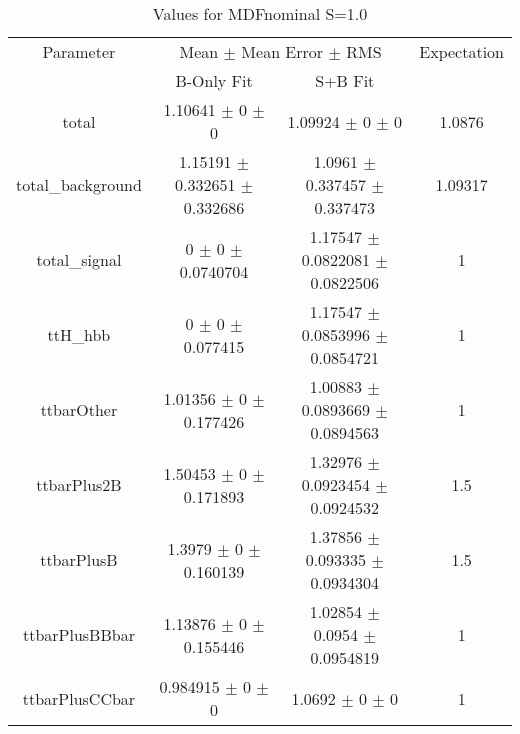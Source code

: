 \begin{table}
\centering
\caption{Values for MDFnominal S=1.0}
\begin{tabular}{cccc}
\toprule
Parameter & \multicolumn{2}{c}{Mean $\pm$ Mean Error $\pm$ RMS} & Expectation\\
 & B-Only Fit & S+B Fit & \\
\midrule
total & \num{1.10641} $\pm$ \num{0} $\pm$ \num{0} & \num{1.09924} $\pm$ \num{0} $\pm$ \num{0} & \num{1.0876}\\
total\_background & \num{1.15191} $\pm$ \num{0.332651} $\pm$ \num{0.332686} & \num{1.0961} $\pm$ \num{0.337457} $\pm$ \num{0.337473} & \num{1.09317}\\
total\_signal & \num{0} $\pm$ \num{0} $\pm$ \num{0.0740704} & \num{1.17547} $\pm$ \num{0.0822081} $\pm$ \num{0.0822506} & \num{1}\\
ttH\_hbb & \num{0} $\pm$ \num{0} $\pm$ \num{0.077415} & \num{1.17547} $\pm$ \num{0.0853996} $\pm$ \num{0.0854721} & \num{1}\\
ttbarOther & \num{1.01356} $\pm$ \num{0} $\pm$ \num{0.177426} & \num{1.00883} $\pm$ \num{0.0893669} $\pm$ \num{0.0894563} & \num{1}\\
ttbarPlus2B & \num{1.50453} $\pm$ \num{0} $\pm$ \num{0.171893} & \num{1.32976} $\pm$ \num{0.0923454} $\pm$ \num{0.0924532} & \num{1.5}\\
ttbarPlusB & \num{1.3979} $\pm$ \num{0} $\pm$ \num{0.160139} & \num{1.37856} $\pm$ \num{0.093335} $\pm$ \num{0.0934304} & \num{1.5}\\
ttbarPlusBBbar & \num{1.13876} $\pm$ \num{0} $\pm$ \num{0.155446} & \num{1.02854} $\pm$ \num{0.0954} $\pm$ \num{0.0954819} & \num{1}\\
ttbarPlusCCbar & \num{0.984915} $\pm$ \num{0} $\pm$ \num{0} & \num{1.0692} $\pm$ \num{0} $\pm$ \num{0} & \num{1}\\
\bottomrule
\end{tabular}
\end{table}